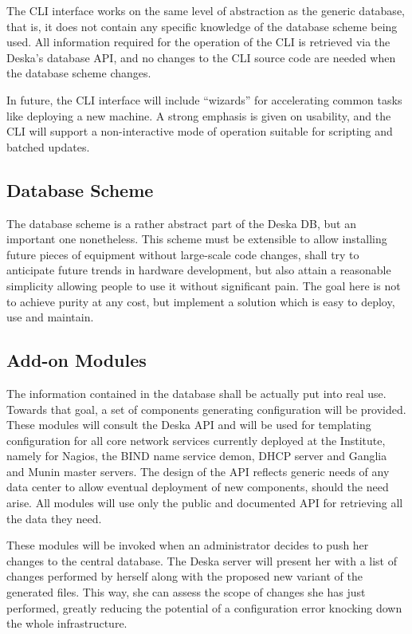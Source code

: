 \documentclass[a4paper]{jpconf}
\begin{document}
The CLI interface works on the same level of abstraction as the generic database, that is, it does not contain any specific knowledge
of the database scheme being used.  All information required for the operation of the CLI is retrieved via the Deska's database API,
and no changes to the CLI source code are needed when the database scheme changes.

In future, the CLI interface will include ``wizards'' for accelerating common tasks like deploying a new machine.  A strong emphasis is
given on usability, and the CLI will support a non-interactive mode of operation suitable for scripting and batched updates.

\subsection{Database Scheme}

The database scheme is a rather abstract part of the Deska DB, but an important one nonetheless.  This scheme must be extensible to
allow installing future pieces of equipment without large-scale code changes, shall try to anticipate future trends in hardware
development, but also attain a reasonable simplicity allowing people to use it without significant pain.  The goal here is not to
achieve purity at any cost, but implement a solution which is easy to deploy, use and maintain.

\subsection{Add-on Modules}

The information contained in the database shall be actually put into real use.  Towards that goal, a set of components generating
configuration will be provided.  These modules will consult the Deska API and will be used for templating configuration for all core
network services currently deployed at the Institute, namely for Nagios, the BIND name service demon, DHCP server and Ganglia and Munin
master servers.  The design of the API reflects generic needs of any data center to allow eventual deployment of new components,
should the need arise.  All modules will use only the public and documented API for retrieving all the data they need.

These modules will be invoked when an administrator decides to push her changes to the central database.  The Deska server will
present her with a list of changes performed by herself along with the proposed new variant of the generated files.  This way, she can
assess the scope of changes she has just performed, greatly reducing the potential of a configuration error knocking down the whole
infrastructure.
\end{document}
